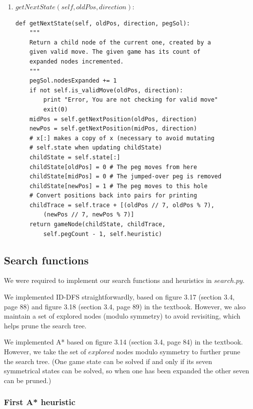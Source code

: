 \documentclass[11pt]{article}
\begin{document}
\begin{enumerate}
\item \(getNextState(self, oldPos, direction)\):

\lstset{language=Python}
\begin{lstlisting}[frame=single]
def getNextState(self, oldPos, direction, pegSol):
	"""
	Return a child node of the current one, created by a
	given valid move. The given game has its count of
	expanded nodes incremented.
	"""
	pegSol.nodesExpanded += 1
	if not self.is_validMove(oldPos, direction):
		print "Error, You are not checking for valid move"
		exit(0)
	midPos = self.getNextPosition(oldPos, direction)
	newPos = self.getNextPosition(midPos, direction)
	# x[:] makes a copy of x (necessary to avoid mutating
	# self.state when updating childState)
	childState = self.state[:]
	childState[oldPos] = 0 # The peg moves from here
	childState[midPos] = 0 # The jumped-over peg is removed
	childState[newPos] = 1 # The peg moves to this hole
	# Convert positions back into pairs for printing
	childTrace = self.trace + [(oldPos // 7, oldPos % 7),
		(newPos // 7, newPos % 7)]
	return gameNode(childState, childTrace,
		self.pegCount - 1, self.heuristic)
\end{lstlisting}

\end{enumerate}

\subsection{Search functions}

We were required to implement our search functions and heuristics in
\(search.py\).

We implemented ID-DFS straightforwardly, based on figure 3.17 (section 3.4,
page 88) and figure 3.18 (section 3.4, page 89) in the textbook. However, we
also maintain a set of explored nodes (modulo symmetry) to avoid revisiting,
which helps prune the search tree.

We implemented A* based on figure 3.14 (section 3.4, page 84) in the textbook.
However, we take the set of \(explored\) nodes modulo symmetry to further prune
the search tree. (One game state can be solved if and only if its seven
symmetrical states can be solved, so when one has been expanded the other
seven can be pruned.)

\subsubsection{First A* heuristic}
\end{document}
